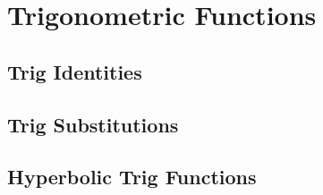 \chapter{Trigonometric Functions}
\section{Trig Identities}
\section{Trig Substitutions}
\section{Hyperbolic Trig Functions}
